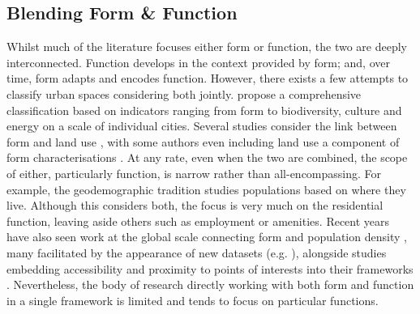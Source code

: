 \subsection{Blending Form \& Function}
\label{sec:lit_gaps}

Whilst much of the literature focuses either form or function, the two
are deeply interconnected. Function develops in the context provided by
form; and, over time, form adapts and encodes function.
%
However, there exists a few attempts to classify urban spaces considering
both jointly. \cite{bourdic2012} propose a comprehensive
classification based on indicators ranging from form to biodiversity, culture and energy on a scale of individual cities.
%
Several studies consider the link between form and land use
\citep{song2007,song2013,bourdic2012}, with some authors even including land
use a component of form characterisations \citep{dibble2019origin}.
At any rate, even when the two are combined, the scope of either,
particularly function, is narrow rather than all-encompassing.
%
For example, the geodemographic tradition
\citep{harris2005,webber2018} studies populations based on where they live.
Although this considers both, the focus is very much on the residential
function, leaving aside others such as employment or amenities.
%
Recent years have also seen work at the global scale connecting form and
population density
\citep{ewing2002measuring,zheng2014urban,oecd2018rethinking}, many facilitated
by the appearance of new datasets (e.g.
\citealp{pesaresi2019ghs,sorichetta2015}), alongside studies embedding
accessibility and proximity to points of interests into their frameworks
\citep{alexiou2016a,venerandi2019machine}.
%
Nevertheless, the
body of research directly working with both form and function in a single
framework is limited and tends to focus on particular functions.


